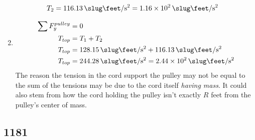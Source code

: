\documentclass{article}
\begin{document}
\begin{enumerate}[label = \boldalpha]
\begin{align*}
			T_2 & = \SI{116.13}{\slug \feet \per \second \squared} = \SI{1.16e2}{\slug \feet \per \second \squared}
		\end{align*}
	\item
		\begin{align*}
			\sum F_y^{pulley} & = 0 \\
			T_{top} & = T_1 + T_2 \\
			T_{top} & = \SI{128.15}{\slug \feet \per \second \squared} + \SI{116.13}{\slug \feet \per \second \squared} \\
			T_{top} & = \SI{244.28}{\slug \feet \per \second \squared} = \SI{2.44e2}{\slug \feet \per \second \squared}
		\end{align*}
		The reason the tension in the cord support the pulley may not be equal to the sum of the tensions may be due to the cord itself \textit{having mass}. It could also stem from how the cord holding the pulley isn't exactly $ R $ feet from the pulley's center of mass.
\end{enumerate}

\subsection{1181}
\end{document}
